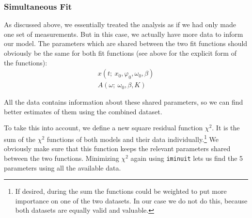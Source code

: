 

\subsubsection{Simultaneous Fit}

As discussed above, we essentially treated the analysis as if we had only made one set of measurements. But in this case, we actually have more data to inform our model. The parameters which are shared between the two fit functions should obviously be the same for both fit functions (see above for the explicit form of the functions):
\begin{gather}
    x(t ; \ x_0, \varphi_0, \omega_0, \beta) \\
    A(\omega ; \ \omega_0, \beta, K)
\end{gather}

All the data contains information about these shared parameters, so we can find better estimates of them using the combined dataset.

To take this into account, we define a new square residual function \( \chi^2 \). It is the sum of the \( \chi^2 \) functions of both models and their data individually.\footnote{If desired, during the sum the functions could be weighted to put more importance on one of the two datasets. In our case we do not do this, because both datasets are equally valid and valuable.} We obviously make sure that this function keeps the relevant parameters shared between the two functions. Minimizing \( \chi^2 \) again using \verb|iminuit| lets us find the \num{5} parameters using all the available data.

